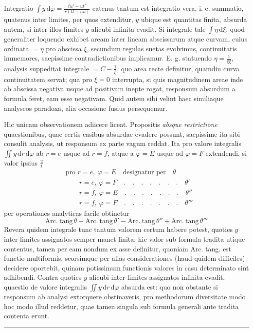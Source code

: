 Integratio $\int y\,\mathrm d\varphi=\frac{tu'-ut'}{r(tt+uu)}$ eatenus tantum est integratio vera, i. e. summatio, quatenus inter limites, per quos extenditur, $y$ ubique est quantitas finita,
absurda autem, si inter illos limites $y$ alicubi infinita evadit. Si integrale tale
$\int\eta\,\mathrm d\xi$, quod generaliter loquendo exhibet aream inter lineam abscissarum atque
curvam, cuius ordinata $=\eta$ pro abscissa $\xi$, secundum regulas suetas evolvimus,
continuitatis immemores, saepissime contradictionibus implicamur. E. g. statuendo
$\eta=\frac1{\xi\xi}$, analysis suppeditat integrale $=C-\frac1\xi$, quo area recte definitur, quamdiu curva continuitatem servat; qua pro $\xi=0$ interrupta, si quis magnitudinem
areae inde ab abscissa negativa usque ad positivam inepte rogat, responsum absurdum a formula feret, eam esse negativam. Quid autem sibi velint haec similiaque
analyseos paradoxa, alia occasione fusius persequemur.

Hic unicam observationem adiicere liceat. Propositis \textit{absque restrictione}
quaestionibus, quae certis casibus absurdae evadere possunt, saepissime ita sibi
consulit analysis, ut responsum ex parte vagum reddat. Ita pro valore integralis
$\iint y\,\mathrm dr\,\mathrm d\varphi$ ab $r=e$ usque ad $r=f$, atque a $\varphi=E$ usque ad $\varphi=F$ extendendi, si valor ipsius $\frac ut$
\[
\begin{aligned}
&\text{pro }r=e,\ \varphi=E\quad\text{designatur per}\quad\theta\\
&\qquad r=e,\ \varphi=F\quad .\quad .\quad .\quad .\quad .\quad .\quad .\quad\theta'\\
&\qquad r=f,\ \varphi=E\quad .\quad .\quad .\quad .\quad .\quad .\quad .\quad\theta''\\
&\qquad r=f,\ \varphi=F\quad .\quad .\quad .\quad .\quad .\quad .\quad .\quad\theta'''
\end{aligned}
\]
per operationes analyticas facile obtinetur
\[
\mathrm{Arc.\ tang}\,\theta-\mathrm{Arc.\ tang}\,\theta'-\mathrm{Arc.\ tang}\,\theta''+\mathrm{Arc.\ tang}\,\theta'''
\]
Revera quidem integrale tunc tantum valorem certum habere potest, quoties $y$
inter limites assignatos semper manet finita: hic valor sub formula tradita utique
contentus, tamen per eam nondum ex asse definitur, quoniam Arc. tang. est functio
multiformis, seorsimque per alias considerationes (haud quidem difficiles) decidere
oportebit, quinam potissimum functionis valores in casu determinato sint adhibendi. Contra quoties $y$ alicubi inter limites assignatos infinita evadit, quaestio
de valore integralis $\iint y\,\mathrm dr\,\mathrm d\varphi$ absurda est: quo non obstante si responsum ab
analysi extorquere obstinaveris, pro methodorum diversitate modo hoc modo illud
reddetur, quae tamen singula sub formula generali ante tradita contenta erunt.
\begin{center}\rule{3cm}{0.3pt}\end{center}
